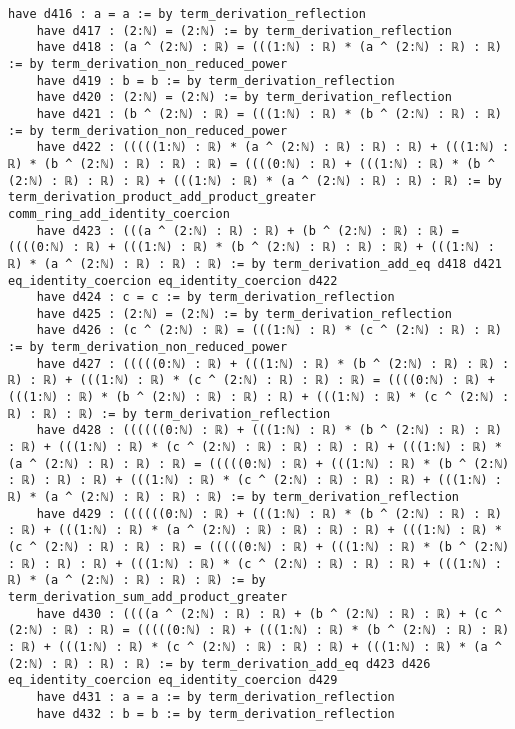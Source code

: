\documentclass{article}
\begin{document}
\begin{tcolorbox}[colback=white!10, width=\linewidth]
\begin{lstlisting}[language=Lean4]
    have d416 : a = a := by term_derivation_reflection
    have d417 : (2:ℕ) = (2:ℕ) := by term_derivation_reflection
    have d418 : (a ^ (2:ℕ) : ℝ) = (((1:ℕ) : ℝ) * (a ^ (2:ℕ) : ℝ) : ℝ) := by term_derivation_non_reduced_power
    have d419 : b = b := by term_derivation_reflection
    have d420 : (2:ℕ) = (2:ℕ) := by term_derivation_reflection
    have d421 : (b ^ (2:ℕ) : ℝ) = (((1:ℕ) : ℝ) * (b ^ (2:ℕ) : ℝ) : ℝ) := by term_derivation_non_reduced_power
    have d422 : (((((1:ℕ) : ℝ) * (a ^ (2:ℕ) : ℝ) : ℝ) : ℝ) + (((1:ℕ) : ℝ) * (b ^ (2:ℕ) : ℝ) : ℝ) : ℝ) = ((((0:ℕ) : ℝ) + (((1:ℕ) : ℝ) * (b ^ (2:ℕ) : ℝ) : ℝ) : ℝ) + (((1:ℕ) : ℝ) * (a ^ (2:ℕ) : ℝ) : ℝ) : ℝ) := by term_derivation_product_add_product_greater comm_ring_add_identity_coercion
    have d423 : (((a ^ (2:ℕ) : ℝ) : ℝ) + (b ^ (2:ℕ) : ℝ) : ℝ) = ((((0:ℕ) : ℝ) + (((1:ℕ) : ℝ) * (b ^ (2:ℕ) : ℝ) : ℝ) : ℝ) + (((1:ℕ) : ℝ) * (a ^ (2:ℕ) : ℝ) : ℝ) : ℝ) := by term_derivation_add_eq d418 d421 eq_identity_coercion eq_identity_coercion d422
    have d424 : c = c := by term_derivation_reflection
    have d425 : (2:ℕ) = (2:ℕ) := by term_derivation_reflection
    have d426 : (c ^ (2:ℕ) : ℝ) = (((1:ℕ) : ℝ) * (c ^ (2:ℕ) : ℝ) : ℝ) := by term_derivation_non_reduced_power
    have d427 : (((((0:ℕ) : ℝ) + (((1:ℕ) : ℝ) * (b ^ (2:ℕ) : ℝ) : ℝ) : ℝ) : ℝ) + (((1:ℕ) : ℝ) * (c ^ (2:ℕ) : ℝ) : ℝ) : ℝ) = ((((0:ℕ) : ℝ) + (((1:ℕ) : ℝ) * (b ^ (2:ℕ) : ℝ) : ℝ) : ℝ) + (((1:ℕ) : ℝ) * (c ^ (2:ℕ) : ℝ) : ℝ) : ℝ) := by term_derivation_reflection
    have d428 : ((((((0:ℕ) : ℝ) + (((1:ℕ) : ℝ) * (b ^ (2:ℕ) : ℝ) : ℝ) : ℝ) + (((1:ℕ) : ℝ) * (c ^ (2:ℕ) : ℝ) : ℝ) : ℝ) : ℝ) + (((1:ℕ) : ℝ) * (a ^ (2:ℕ) : ℝ) : ℝ) : ℝ) = (((((0:ℕ) : ℝ) + (((1:ℕ) : ℝ) * (b ^ (2:ℕ) : ℝ) : ℝ) : ℝ) + (((1:ℕ) : ℝ) * (c ^ (2:ℕ) : ℝ) : ℝ) : ℝ) + (((1:ℕ) : ℝ) * (a ^ (2:ℕ) : ℝ) : ℝ) : ℝ) := by term_derivation_reflection
    have d429 : ((((((0:ℕ) : ℝ) + (((1:ℕ) : ℝ) * (b ^ (2:ℕ) : ℝ) : ℝ) : ℝ) + (((1:ℕ) : ℝ) * (a ^ (2:ℕ) : ℝ) : ℝ) : ℝ) : ℝ) + (((1:ℕ) : ℝ) * (c ^ (2:ℕ) : ℝ) : ℝ) : ℝ) = (((((0:ℕ) : ℝ) + (((1:ℕ) : ℝ) * (b ^ (2:ℕ) : ℝ) : ℝ) : ℝ) + (((1:ℕ) : ℝ) * (c ^ (2:ℕ) : ℝ) : ℝ) : ℝ) + (((1:ℕ) : ℝ) * (a ^ (2:ℕ) : ℝ) : ℝ) : ℝ) := by term_derivation_sum_add_product_greater
    have d430 : ((((a ^ (2:ℕ) : ℝ) : ℝ) + (b ^ (2:ℕ) : ℝ) : ℝ) + (c ^ (2:ℕ) : ℝ) : ℝ) = (((((0:ℕ) : ℝ) + (((1:ℕ) : ℝ) * (b ^ (2:ℕ) : ℝ) : ℝ) : ℝ) + (((1:ℕ) : ℝ) * (c ^ (2:ℕ) : ℝ) : ℝ) : ℝ) + (((1:ℕ) : ℝ) * (a ^ (2:ℕ) : ℝ) : ℝ) : ℝ) := by term_derivation_add_eq d423 d426 eq_identity_coercion eq_identity_coercion d429
    have d431 : a = a := by term_derivation_reflection
    have d432 : b = b := by term_derivation_reflection

\end{lstlisting}
\end{tcolorbox}
\end{document}
